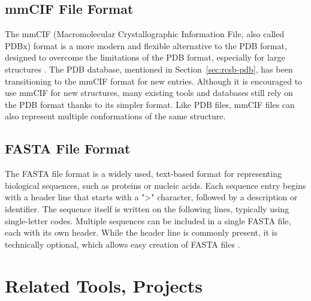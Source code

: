 \begin{figure}[H]
    \centering
    
\end{figure}


\subsection{mmCIF File Format}
\label{sec:mmcif-format}

The mmCIF (Macromolecular Crystallographic Information File, also called PDBx) format is a more modern and flexible alternative to the PDB format, designed to overcome the limitations of the PDB format, especially for large structures \cite{bourne199730}. The PDB database, mentioned in Section~\ref{sec:rcsb-pdb}, has been transitioning to the mmCIF format for new entries. Although it is encouraged to use mmCIF for new structures, many existing tools and databases still rely on the PDB format thanks to its simpler format. Like PDB files, mmCIF files can also represent multiple conformations of the same structure.

\subsection{FASTA File Format}
\label{sec:fasta-format}

The FASTA file format is a widely used, text-based format for representing biological sequences, such as proteins or nucleic acids. Each sequence entry begins with a header line that starts with a ">" character, followed by a description or identifier. The sequence itself is written on the following lines, typically using single-letter codes. Multiple sequences can be included in a single FASTA file, each with its own header. While the header line is commonly present, it is technically optional, which allows easy creation of FASTA files \cite{lipman1985rapid}.

\begin{figure}[H]
    \centering
    
\end{figure}

\section{Related Tools, Projects}
\label{sec:related-tools}

